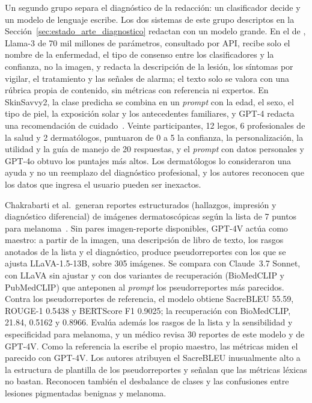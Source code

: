 Un segundo grupo separa el diagnóstico de la redacción: un clasificador decide y un modelo de lenguaje escribe.
Los dos sistemas de este grupo descriptos en la Sección~\ref{sec:estado_arte_diagnostico} redactan con un
modelo grande. En el de \textcite{khan2025ensemble}, Llama-3 de 70 mil millones de parámetros, consultado por API,
recibe solo el nombre de la enfermedad, el tipo de consenso entre los clasificadores y la confianza, no la imagen, y
redacta la descripción de la lesión, los síntomas por vigilar, el tratamiento y las señales de alarma; el texto solo
se valora con una rúbrica propia de contenido, sin métricas con referencia ni expertos. En SkinSavvy2, la clase predicha se combina en un \emph{prompt} con la edad,
el sexo, el tipo de piel, la exposición solar y los antecedentes familiares, y GPT-4 redacta una recomendación de
cuidado~\cite{kim2025skinsavvy2}. Veinte participantes, 12 legos, 6 profesionales de la salud y 2 dermatólogos,
puntuaron de 0 a 5 la confianza, la personalización, la utilidad y la guía de manejo de 20 respuestas, y el
\emph{prompt} con datos personales y GPT-4o obtuvo los puntajes más altos. Los dermatólogos lo consideraron una ayuda
y no un reemplazo del diagnóstico profesional, y los autores reconocen que los datos que ingresa el usuario pueden ser
inexactos.

Chakrabarti et al.\ generan reportes estructurados (hallazgos, impresión y diagnóstico diferencial) de imágenes
dermatoscópicas según la lista de 7 puntos para melanoma~\cite{chakrabarti2025skin}. Sin pares imagen-reporte
disponibles, GPT-4V actúa como maestro: a partir de la imagen, una descripción de libro de texto, los rasgos anotados
de la lista y el diagnóstico, produce pseudorreportes con los que se ajusta LLaVA-1.5-13B, sobre 305 imágenes. Se
compara con Claude~3.7 Sonnet, con LLaVA sin ajustar y con dos variantes de recuperación (BioMedCLIP y PubMedCLIP)
que anteponen al \emph{prompt} los pseudorreportes más parecidos. Contra los pseudorreportes de referencia, el modelo
obtiene SacreBLEU 55.59, ROUGE-1 0.5438 y BERTScore F1 0.9025; la recuperación con BioMedCLIP, 21.84, 0.5162 y
0.8966. Evalúa además los rasgos de la lista y la sensibilidad y especificidad para melanoma, y un médico revisa 30
reportes de este modelo y de GPT-4V. Como la referencia la escribe el propio maestro, las métricas miden el parecido
con GPT-4V. Los autores atribuyen el SacreBLEU inusualmente alto a la estructura de plantilla de los
pseudorreportes y señalan que las métricas léxicas no bastan. Reconocen también el desbalance de clases y las confusiones entre lesiones pigmentadas benignas y melanoma.

